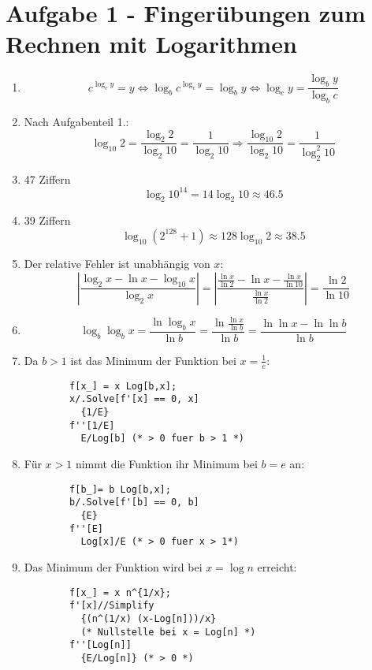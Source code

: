 \section*{Aufgabe 1 - Fingerübungen zum Rechnen mit Logarithmen}

\begin{enumerate}
\item
	\[ c^{\log_c y} = y \Leftrightarrow 
	\log_b c^{\log_c y} = \log_b y \Leftrightarrow \log_c y =
	\frac{\log_b y}{\log_b c}\]
\item Nach Aufgabenteil 1.:
	\[ \log_{10} 2 = \frac{\log_2 2}{\log_2 10} = \frac{1}{\log_2 10}
	\Rightarrow \frac{\log_{10} 2}{\log_2 10} = \frac{1}{\log_2^2 10} \]

\item 47 Ziffern \[ \log_2 10^{14} = 14 \log_2 10 \approx 46.5 \]

\item 39 Ziffern \[ \log_{10} (2^{128} + 1) \approx 128 \log_{10} 2 \approx 38.5 \]

\item Der relative Fehler ist unabhängig von $x$:
	\[ \left| \frac{\log_2 x - \ln x - \log_{10} x}{\log_2 x} \right| =
	\left| \frac{\frac{\ln x}{\ln 2} - \ln x - \frac{\ln x}{\ln
	10}}{\frac{\ln x}{\ln 2}} \right| = \frac{\ln 2}{\ln 10} \]

\item
	\[ \log_b \log_b x = \frac{\ln \log_b x}{\ln b} = \frac{\ln \frac{\ln
	x}{\ln b}}{\ln b} = \frac{\ln \ln x - \ln \ln b}{\ln b}\]

\item Da $b > 1$ ist das Minimum der Funktion bei $x = \frac{1}{e}$:
	\lstset{language=Mathematice}
	\begin{lstlisting}
		f[x_] = x Log[b,x];
		x/.Solve[f'[x] == 0, x]
		  {1/E}
		f''[1/E]
		  E/Log[b] (* > 0 fuer b > 1 *)
	\end{lstlisting}

\item Für $x > 1$ nimmt die Funktion ihr Minimum bei $b = e$ an:
	\begin{lstlisting}
		f[b_]= b Log[b,x];
		b/.Solve[f'[b] == 0, b]
		  {E}
		f''[E]
		  Log[x]/E (* > 0 fuer x > 1*)
	\end{lstlisting}

\item Das Minimum der Funktion wird bei $x = \log n$ erreicht:
	\begin{lstlisting}
		f[x_] = x n^{1/x};
		f'[x]//Simplify
		  {(n^(1/x) (x-Log[n]))/x}
		  (* Nullstelle bei x = Log[n] *)
		f''[Log[n]]
		  {E/Log[n]} (* > 0 *)
	\end{lstlisting}


\end{enumerate}
